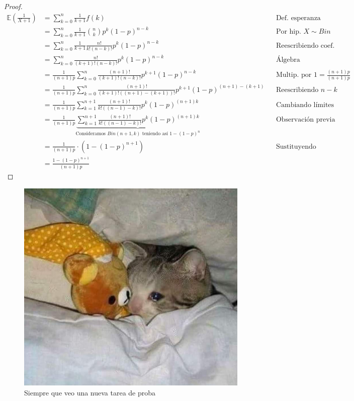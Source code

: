 \documentclass[11pt,letterpaper]{report}
\begin{document}
\begin{enumerate}
\begin{proof}
\begin{align*}
    \mathds{E}(\frac{1}{X+1})
        &= \sum_{k=0}^{n} \frac{1}{k+1} f(k) && \text{Def. esperanza}\\
        &= \sum_{k=0}^{n} \frac{1}{k+1} \binom{n}{k} p^k (1-p)^{n-k} && \text{Por hip. $X \sim Bin$}\\
        &= \sum_{k=0}^{n} \frac{1}{k+1} \frac{n!}{k!(n-k)!} p^k (1-p)^{n-k} && \text{Reescribiendo coef. binomial}\\
        &= \sum_{k=0}^{n} \frac{n!}{(k+1)!(n-k)!} p^k (1-p)^{n-k} && \text{Álgebra}\\
        &= \frac{1}{(n+1)p}\sum_{k=0}^{n} \frac{(n+1)!}{(k+1)!(n-k)!} p^{k+1} (1-p)^{n-k} && \text{Multip. por $1=\frac{(n+1)p}{(n+1)p}$}\\
        &= \frac{1}{(n+1)p}\sum_{k=0}^{n} \frac{(n+1)!}{(k+1)!((n+1)-(k+1))!} p^{k+1} (1-p)^{(n+1)-(k+1)} && \text{Reescribiendo $n-k$}\\
        &= \frac{1}{(n+1)p}\sum_{k=1}^{n+1} \frac{(n+1)!}{k!((n-1)-k)!} p^{k} (1-p)^{(n+1)k} && \text{Cambiando límites de la suma}\\
        &= \frac{1}{(n+1)p} \underbrace{\sum_{k=1}^{n+1} \frac{(n+1)!}{k!((n-1)-k)!} p^{k} (1-p)^{(n+1)k}}_{\text{Consideramos $Bin(n+1,k)$ teniendo así $1 - (1-p)^n$}}
            && \text{Observación previa}\\
        &= \frac{1}{(n+1)p} \cdot (1 - (1-p)^{n+1}) && \text{Sustituyendo}\\
        &= \frac{1 - (1-p)^{n+1}}{(n+1)p}
\end{align*}
\end{proof}

\begin{figure}[H]
    \centering
    \includegraphics[scale=0.25]{triste1.jpg}
    \caption{Siempre que veo una nueva tarea de proba \faFrownO}
\end{figure}


\end{enumerate}
\end{document}
